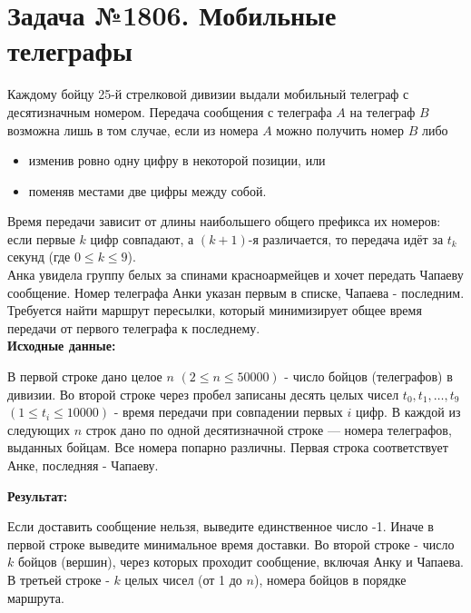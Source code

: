 \documentclass[a4paper,12pt]{article}
\begin{document}
\section*{Задача №1806. Мобильные телеграфы}
Каждому бойцу 25-й стрелковой дивизии выдали мобильный телеграф с десятизначным номером. Передача сообщения с телеграфа \(A\) на телеграф \(B\) возможна лишь в том случае, если из номера \(A\) можно получить номер \(B\) либо  
\begin{itemize}
  \item изменив ровно одну цифру в некоторой позиции, или  
  \item поменяв местами две цифры между собой.  
\end{itemize}
Время передачи зависит от длины наибольшего общего префикса их номеров: если первые \(k\) цифр совпадают, а \((k+1)\)-я различается, то передача идёт за \(t_k\) секунд (где \(0 \le k \le 9\)).\\[0.5em] 
Анка увидела группу белых за спинами красноармейцев и хочет передать Чапаеву сообщение. Номер телеграфа Анки указан первым в списке, Чапаева - последним. Требуется найти маршрут пересылки, который минимизирует общее время передачи от первого телеграфа к последнему.\\[1em]
\textbf{Исходные данные:}
\begin{quotebox}
    В первой строке дано целое \(n\) \((2 \le n \le 50000)\) - число бойцов (телеграфов) в дивизии. Во второй строке через пробел записаны десять целых чисел \(t_0, t_1, \dots, t_9\) \((1 \le t_i \le 10000)\) - время передачи при совпадении первых \(i\) цифр. В каждой из следующих \(n\) строк дано по одной десятизначной строке — номера телеграфов, выданных бойцам. Все номера попарно различны. Первая строка соответствует Анке, последняя - Чапаеву.
\end{quotebox}
\textbf{Результат:}
\begin{quotebox}
    Если доставить сообщение нельзя, выведите единственное число -1. Иначе в первой строке выведите минимальное время доставки. Во второй строке - число \(k\) бойцов (вершин), через которых проходит сообщение, включая Анку и Чапаева. В третьей строке - \(k\) целых чисел (от 1 до \(n\)), номера бойцов в порядке маршрута.
 
\end{quotebox}
\end{document}
